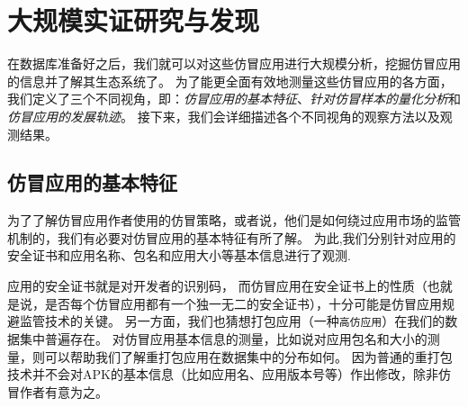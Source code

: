 \chapter{大规模实证研究与发现}
\label{chp:discoveries}

在数据库准备好之后，我们就可以对这些仿冒应用进行大规模分析，挖掘仿冒应用的信息并了解其生态系统了。
为了能更全面有效地测量这些仿冒应用的各方面，我们定义了三个不同视角，即：\emph{仿冒应用的基本特征}、\emph{针对仿冒样本的量化分析}和\emph{仿冒应用的发展轨迹}。
接下来，我们会详细描述各个不同视角的观察方法以及观测结果。

\section{仿冒应用的基本特征}
\label{sec:fakeCharacteristics}
为了了解仿冒应用作者使用的仿冒策略，或者说，他们是如何绕过应用市场的监管机制的，我们有必要对仿冒应用的基本特征有所了解。
为此,我们分别针对应用的安全证书和应用名称、包名和应用大小等基本信息进行了观测.

应用的安全证书就是对开发者的识别码，
而仿冒应用在安全证书上的性质（也就是说，是否每个仿冒应用都有一个独一无二的安全证书），十分可能是仿冒应用规避监管技术的关键。
另一方面，我们也猜想打包应用（一种\texttt{高仿应用}）在我们的数据集中普遍存在。
对仿冒应用基本信息的测量，比如说对应用包名和大小的测量，则可以帮助我们了解重打包应用在数据集中的分布如何。
因为普通的重打包技术并不会对APK的基本信息（比如应用名、应用版本号等）作出修改，除非仿冒作者有意为之。

